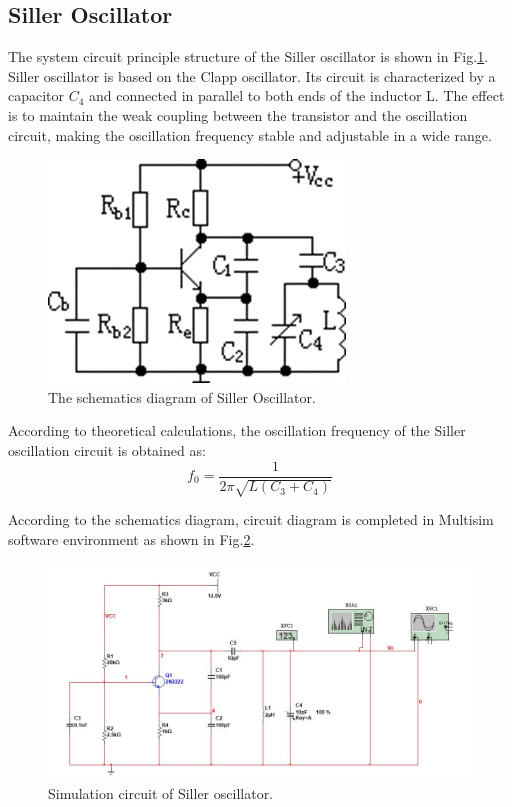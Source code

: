 \documentclass[conference]{IEEEtran}
\begin{document}
\subsection{Siller Oscillator}
The system circuit principle structure of the Siller oscillator is shown in Fig.\ref{fig5-15}. Siller oscillator is based on the Clapp oscillator. Its circuit is characterized by a capacitor $C_4$ and connected in parallel to both ends of the inductor L. The effect is to maintain the weak coupling between the transistor and the oscillation circuit, making the oscillation frequency stable and adjustable in a wide range. 

\begin{figure}[!h]
\centerline{\includegraphics[scale=0.6]{fig/pic5-15.jpg}}
\caption{The schematics diagram of Siller Oscillator.}
\label{fig5-15}
\end{figure}

According to theoretical calculations, the oscillation frequency of the Siller oscillation circuit is obtained as:
\begin{equation}
f_0=\frac{1}{2\pi \sqrt{L(C_3+C_4)}}
\label{eq5-1}
\end{equation}

According to the schematics diagram, circuit diagram is completed in Multisim software environment as shown in Fig.\ref{fig5-16}.
\begin{figure}[!h]
\centerline{\includegraphics[scale=0.3]{fig/pic5-16.jpg}}
\caption{Simulation circuit of Siller oscillator.}
\label{fig5-16}
\end{figure}
\end{document}

